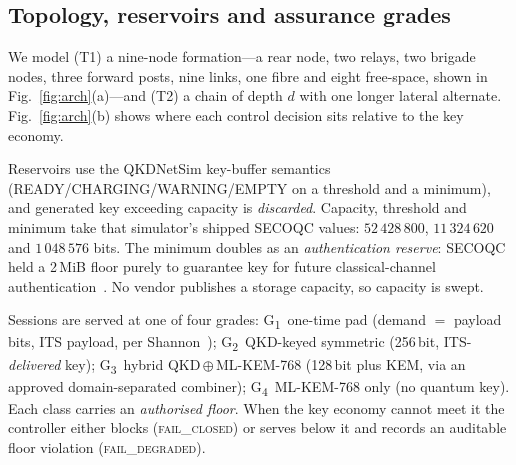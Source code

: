 \documentclass[conference]{IEEEtran}
\newcommand{\GI}{G\textsubscript{1}}
\newcommand{\GII}{G\textsubscript{2}}
\newcommand{\GIII}{G\textsubscript{3}}
\newcommand{\GIV}{G\textsubscript{4}}
\begin{document}
\subsection{Topology, reservoirs and assurance grades}
We model (T1) a nine-node formation---a rear node, two relays, two brigade nodes,
three forward posts, nine links, one fibre and eight free-space, shown in
Fig.~\ref{fig:arch}(a)---and (T2) a chain of depth $d$ with one longer lateral
alternate. Fig.~\ref{fig:arch}(b) shows where each control decision sits relative
to the key economy.

Reservoirs use the QKDNetSim key-buffer semantics (READY/CHARGING/WARNING/EMPTY
on a threshold and a minimum), and generated key exceeding capacity is
\emph{discarded}. Capacity, threshold and minimum take that simulator's shipped
SECOQC values: $52\,428\,800$, $11\,324\,620$ and $1\,048\,576$ bits. The minimum
doubles as an \emph{authentication reserve}: SECOQC held a 2\,MiB floor purely to
guarantee key for future classical-channel authentication~\cite{peev}. No vendor
publishes a storage capacity, so capacity is swept.

Sessions are served at one of four grades: \GI\ one-time pad (demand $=$ payload
bits, ITS payload, per Shannon~\cite{shannon}); \GII\ QKD-keyed symmetric
(256\,bit, ITS-\emph{delivered} key); \GIII\ hybrid QKD\,$\oplus$\,ML-KEM-768
(128\,bit plus KEM, via an approved domain-separated combiner); \GIV\ ML-KEM-768
only (no quantum key). Each class carries an \emph{authorised floor}. When the
key economy cannot meet it the controller either blocks
(\textsc{fail\_closed}) or serves below it and records an auditable floor
violation (\textsc{fail\_degraded}).
\end{document}

